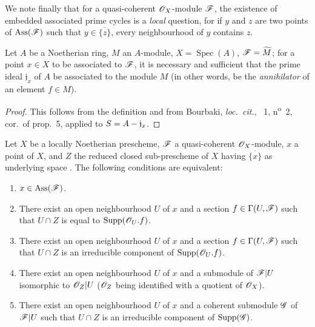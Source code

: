 We note finally that for a quasi-coherent $\mathscr{O}_X$-module $\mathscr{F}$, the existence of embedded associated prime cycles is a \emph{local} question, for if $y$ and $z$ are two points of $\operatorname{Ass}(\mathscr{F})$ such that $y\in\overline{\{z\}}$, every neighbourhood of $y$ contains $z$.

\begin{proposition}[3.1.2]
\label{IV.3.1.2}
Let $A$ be a Noetherian ring, $M$ an $A$-module, $X=\operatorname{Spec}(A)$, $\mathscr{F}=\widetilde{M}$; for a point $x\in X$ to be associated to $\mathscr{F}$, it is necessary and sufficient that the prime ideal $\mathfrak{j}_x$ of $A$ be associated to the module $M$ \textup{(in other words, be the \emph{annihilator} of an element $f\in M$)}.
\end{proposition}

\begin{proof}
This follows from the definition  and from Bourbaki, \emph{loc.\ cit.}, \textsection~1, n\textsuperscript{o}~2, cor.\ of prop.~5, applied to $S=A-\mathfrak{j}_x$.
\end{proof}

\begin{proposition}[3.1.3]
\label{IV.3.1.3}
Let $X$ be a locally Noetherian prescheme, $\mathscr{F}$ a quasi-coherent $\mathscr{O}_X$-module, $x$ a point of $X$, and $Z$ the reduced closed sub-prescheme of $X$ having $\overline{\{x\}}$ as underlying space .
The following conditions are equivalent:
\begin{enumerate}
  \item[\emph{a)}] $x\in\operatorname{Ass}(\mathscr{F})$.
  \item[\emph{b)}] There exist an open neighbourhood $U$ of $x$ and a section $f\in\Gamma(U,\mathscr{F})$ such that $U\cap Z$ is equal to $\operatorname{Supp}(\mathscr{O}_U.f)$.
  \item[\emph{b$'$)}] There exist an open neighbourhood $U$ of $x$ and a section $f\in\Gamma(U,\mathscr{F})$ such that $U\cap Z$ is an irreducible component of $\operatorname{Supp}(\mathscr{O}_U.f)$.
  \item[\emph{c)}] There exist an open neighbourhood $U$ of $x$ and a submodule of $\mathscr{F}|U$ isomorphic to $\mathscr{O}_Z|U$ \textup{($\mathscr{O}_Z$ being identified with a quotient of $\mathscr{O}_X$)}.
  \item[\emph{c$'$)}] There exist an open neighbourhood $U$ of $x$ and a coherent submodule $\mathscr{G}$ of $\mathscr{F}|U$ such that $U\cap Z$ is an irreducible component of $\operatorname{Supp}(\mathscr{G})$.
\end{enumerate}
\end{proposition}

